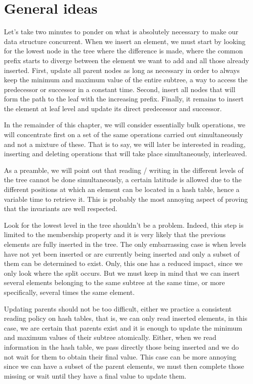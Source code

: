 
\section{General ideas}

Let's take two minutes to ponder on what is absolutely necessary to make our data structure concurrent. When we insert an element, we must start by looking for the lowest node in the tree where the difference is made, where the common prefix starts to diverge between the element we want to add and all those already inserted. First, update all parent nodes as long as necessary in order to always keep the minimum and maximum value of the entire subtree, a way to access the predecessor or successor in a constant time. Second, insert all nodes that will form the path to the leaf with the increasing prefix. Finally, it remains to insert the element at leaf level and update its direct predecessor and successor.

In the remainder of this chapter, we will consider essentially bulk operations, we will concentrate first on a set of the same operations carried out simultaneously and not a mixture of these. That is to say, we will later be interested in reading, inserting and deleting operations that will take place simultaneously, interleaved.

As a preamble, we will point out that reading / writing in the different levels of the tree cannot be done simultaneously, a certain latitude is allowed due to the different positions at which an element can be located in a hash table, hence a variable time to retrieve it. This is probably the most annoying aspect of proving that the invariants are well respected.

Look for the lowest level in the tree shouldn't be a problem. Indeed, this step is limited to the membership property and it is very likely that the previous elements are fully inserted in the tree. The only embarrassing case is when levels have not yet been inserted or are currently being inserted and only a subset of them can be determined to exist. Only, this one has a reduced impact, since we only look where the split occurs. But we must keep in mind that we can insert several elements belonging to the same subtree at the same time, or more specifically, several times the same element.

Updating parents should not be too difficult, either we practice a consistent reading policy on hash tables, that is, we can only read inserted elements, in this case, we are certain that parents exist and it is enough to update the minimum and maximum values of their subtree atomically. Either, when we read information in the hash table, we pass directly those being inserted and we do not wait for them to obtain their final value. This case can be more annoying since we can have a subset of the parent elements, we must then complete those missing or wait until they have a final value to update them.


